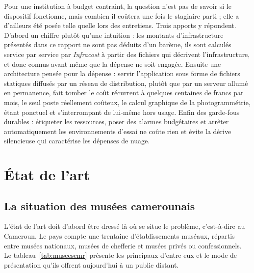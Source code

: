 Pour une institution à budget contraint, la question n'est pas de savoir si le
dispositif fonctionne, mais combien il coûtera une fois le stagiaire parti ; elle
a d'ailleurs été posée telle quelle lors des entretiens. Trois apports y
répondent. D'abord un chiffre plutôt qu'une intuition : les montants
d'infrastructure présentés dans ce rapport ne sont pas déduits d'un barème, ils
sont calculés service par service par \emph{Infracost} à partir des fichiers qui
décrivent l'infrastructure, et donc connus avant même que la dépense ne soit
engagée. Ensuite une architecture pensée pour la dépense : servir l'application
sous forme de fichiers statiques diffusés par un réseau de distribution, plutôt
que par un serveur allumé en permanence, fait tomber le coût récurrent à
quelques centaines de francs par mois, le seul poste réellement coûteux, le
calcul graphique de la photogrammétrie, étant ponctuel et s'interrompant de
lui-même hors usage. Enfin des garde-fous durables : étiqueter les ressources,
poser des alarmes budgétaires et arrêter automatiquement les environnements
d'essai ne coûte rien et évite la dérive silencieuse qui caractérise les
dépenses de nuage.

\section{État de l'art}
\label{sec:etatart}

\subsection{La situation des musées camerounais}

L'état de l'art doit d'abord être dressé là où se situe le problème, c'est-à-dire
au Cameroun. Le pays compte une trentaine d'établissements muséaux, répartis
entre musées nationaux, musées de chefferie et musées privés ou confessionnels.
Le tableau~\ref{tab:museescmr} présente les principaux d'entre eux et le mode de
présentation qu'ils offrent aujourd'hui à un public distant.

